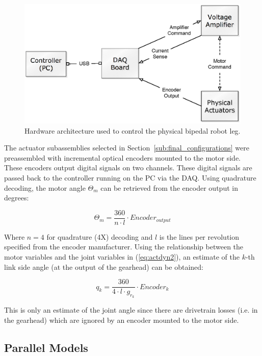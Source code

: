 \begin{figure}[!h]
	\centering
    \includegraphics[scale=0.65]{fig/experiments/hilarchitecture.eps} 
  	\caption{Hardware architecture used to control the physical bipedal robot leg.}
	\label{fig:hilarch}
\end{figure}

The actuator subassemblies selected in Section~\ref{sub:final_configurations} were preassembled with incremental optical encoders mounted to the motor side. These encoders output digital signals on two channels.  These digital signals are passed back to the controller running on the PC via the DAQ. Using quadrature decoding, the motor angle $\Theta _m$ can be retrieved from the encoder output in degrees: 

\begin{equation}
	{\Theta _m} = \frac{{360}}{{n \cdot l}} \cdot Encoder_{output}
\end{equation}

Where $n = 4$ for quadrature (4X) decoding and $l$ is the lines per revolution specified from the encoder manufacturer. Using the relationship between the motor variables and the joint variables in (\ref{eq:actdyn2}), an estimate of the $k$-th link side angle (at the output of the gearhead) can be obtained: 

\begin{equation}
	{q_k} = \frac{{360}}{{4 \cdot l \cdot {g_{{r_k}}}}} \cdot Encode{r_k}
	\label{eq:quadrature}
\end{equation}

This is only an estimate of the joint angle since there are drivetrain losses (i.e. in the gearhead) which are ignored by an encoder mounted to the motor side. 

\subsection{Parallel Models} %
\label{sub:parallel_models}

